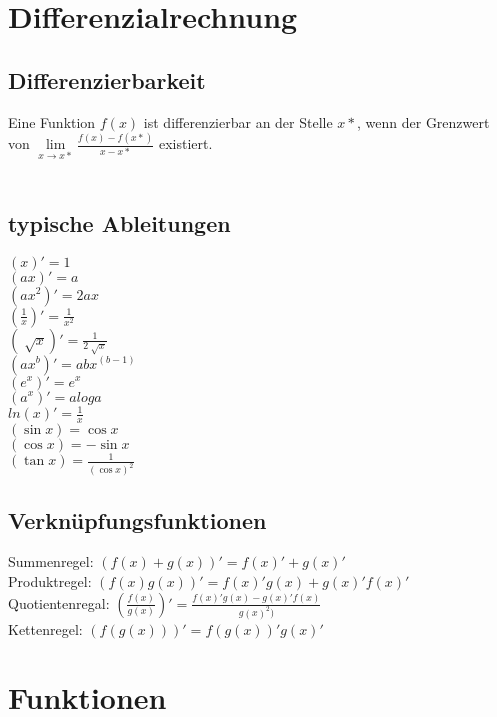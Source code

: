 \documentclass[a4paper,landscape, 11pt]{article}
\newcommand{\limFromTo}[2]{ \lim\limits_{#2 \rightarrow #1}}
\begin{document}
\begin{multicols}{4}
\begin{small}
    \section{Differenzialrechnung}
    	\subsection{Differenzierbarkeit}
                  Eine Funktion $f(x)$ ist differenzierbar an der Stelle $x*$, wenn der Grenzwert von $\limFromTo{x*}{x} \frac{f(x) - f(x*)}{x - x*}$ existiert. 
                  \\ \\
    	\subsection{typische Ableitungen}
    	   \begin{multicols}{2}		
    	   		$(x)' = 1$ \\
    			$(ax)' = a$ \\
    			$(ax^2)' = 2ax$ \\
    			$(\frac{1}{x})' = \frac{1}{x^2}$ \\
    			$(\sqrt[]{x})' = \frac{1}{2\sqrt[]{x}}$ \\
    			$(ax^b)' = abx^(b-1)$ \\
    			$(e^x)' = e^x $ \\
    			$(a^x)' = aloga $ \\
    			$ln(x)' = \frac{1}{x}$ \\
    		 	$(\sin x) = \cos x$ \\
    		 	$(\cos x) = -\sin x$ \\
    		 	$(\tan x) = \frac{1}{(\cos x)^2}$ \\ 
    		 	\end{multicols}
      \subsection{Verknüpfungsfunktionen}
      			Summenregel: $(f(x) + g(x))' = f(x)' + g(x)' $ \\ 
      			Produktregel: $(f(x)g(x))' = f(x)'g(x)+g(x)'f(x)' $ \\
      			Quotientenregal: $(\frac{f(x)}{g(x)})' = \frac{f(x)'g(x)-g(x)'f(x)}{g(x)^2)}$ \\
      			Kettenregel: 
      			$(f(g(x)))' = f(g(x))'g(x)'$ \\
      		 
    			
     \section{Funktionen}

\end{small}
\end{multicols}
\end{document}
